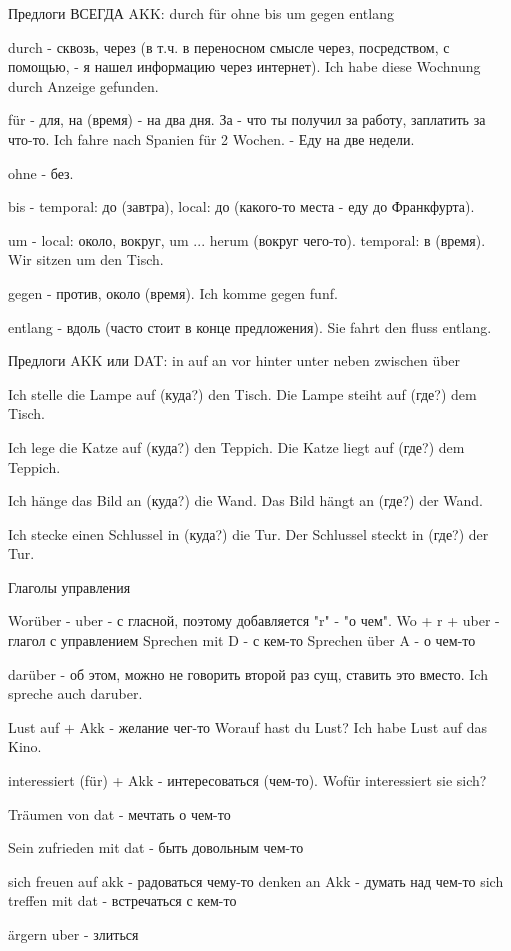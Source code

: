 \documentclass[12pt]{report}
\begin{document}
Предлоги ВСЕГДА AKK:
durch für ohne bis um gegen entlang 

durch - сквозь, через (в т.ч. в переносном смысле через, посредством, с помощью, - я нашел информацию через интернет).
Ich habe diese Wochnung durch Anzeige gefunden.

für - для, на (время) - на два дня. За - что ты получил за работу, заплатить за что-то.
Ich fahre nach Spanien für 2 Wochen. - Еду на две недели.

ohne - без.

bis - temporal: до (завтра), local: до (какого-то места - еду до Франкфурта).

um - local: около, вокруг, um ... herum (вокруг чего-то). temporal: в (время). Wir sitzen um den Tisch.

gegen - против, около (время). Ich komme gegen funf.

entlang - вдоль (часто стоит в конце предложения). Sie fahrt den fluss entlang.

Предлоги AKK или DAT:
in auf an vor hinter unter neben zwischen über

Ich stelle die Lampe auf (куда?) den Tisch.
Die Lampe steiht auf (где?) dem Tisch.

Ich lege die Katze auf (куда?) den Teppich.
Die Katze liegt auf (где?) dem Teppich.

Ich hänge das Bild an (куда?) die Wand.
Das Bild hängt an (где?) der Wand.

Ich stecke einen Schlussel in (куда?) die Tur.
Der Schlussel steckt in (где?) der Tur.

Глаголы управления

Worüber - uber - с гласной, поэтому добавляется "r" - "о чем". Wo + r + uber - глагол с управлением
Sprechen mit D - с кем-то
Sprechen über A - о чем-то

darüber - об этом, можно не говорить второй раз сущ, ставить это вместо. Ich spreche auch daruber.

Lust auf + Akk - желание чег-то Worauf hast du Lust? Ich habe Lust auf das Kino.

interessiert (für) + Akk - интересоваться (чем-то). Wofür interessiert sie sich?

Träumen von dat - мечтать о чем-то

Sein zufrieden mit dat - быть довольным чем-то

sich freuen auf akk - радоваться чему-то
denken an Akk - думать над чем-то
sich treffen mit dat - встречаться с кем-то

ärgern uber - злиться 
\end{document}
